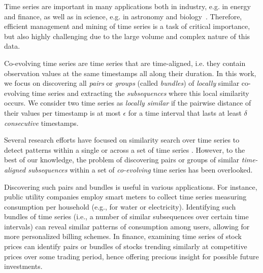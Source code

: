 Time series are important in many applications both in industry, e.g. in energy and finance, as well as in science, e.g. in astronomy and biology~\cite{DBLP:journals/sigmod/Palpanas15}. Therefore, efficient management and mining of time series is a task of critical importance, but also highly challenging due to the large volume and complex nature of this data. 

Co-evolving time series are time series that are time-aligned, i.e. they contain observation values at the same timestamps all along their duration. In this work, we focus on discovering all \textit{pairs} or \textit{groups} (called \textit{bundles}) of \textit{locally} similar co-evolving time series and extracting the \textit{subsequences} where this local similarity occurs. We consider two time series as \textit{locally similar} if the pairwise distance of their values per timestamp is at most $\epsilon$ for a time interval that lasts at least $\delta$ \textit{consecutive} timestamps.

Several research efforts have focused on similarity search over time series to detect patterns within a single or across a set of time series \cite{rakthanmanon2012searching, yeh2016matrix, linardi2018scalable, DBLP:conf/sofsem/Palpanas16}. However, to the best of our knowledge, the problem of discovering pairs or groups of similar \textit{time-aligned subsequences} within a set of \textit{co-evolving} time series has been overlooked.

Discovering such pairs and bundles is useful in various applications. For instance, public utility companies employ smart meters to collect time series measuring consumption per household (e.g., for water or electricity). Identifying such bundles of time series (i.e., a number of similar subsequences over certain time intervals) can reveal similar patterns of consumption among users, allowing for more personalized billing schemes. In finance, examining time series of stock prices can identify pairs or bundles of stocks trending similarly at competitive prices over some trading period, hence offering precious insight for possible future investments.


